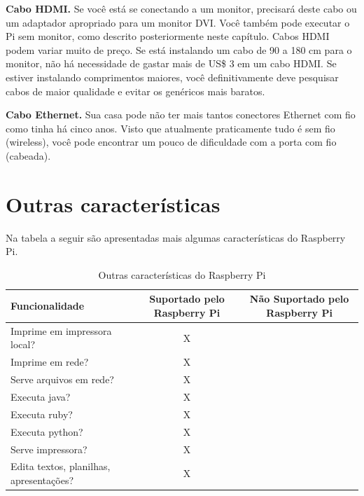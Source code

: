 \textbf{Cabo HDMI.} Se você está se conectando a um monitor, precisará deste cabo ou um adaptador apropriado para um monitor DVI. Você também pode executar o Pi sem monitor, como descrito posteriormente neste capítulo. Cabos HDMI podem variar muito de preço. Se está instalando um cabo de 90 a 180 cm para o monitor, não há necessidade de gastar mais de US\$ 3 em um cabo HDMI. Se estiver instalando comprimentos maiores, você definitivamente deve pesquisar cabos de maior qualidade e evitar os genéricos mais baratos.

\textbf{Cabo Ethernet.} Sua casa pode não ter mais tantos conectores Ethernet com fio como tinha há cinco anos. Visto que atualmente praticamente tudo é sem fio (wireless), você pode encontrar um pouco de dificuldade com a porta com fio (cabeada).

\newpage

\section{Outras características}

Na tabela a seguir são apresentadas mais algumas características do Raspberry Pi.

\begin{table}[!htpb]
 \centering
    \begin{tabular}{|p{4cm}|c|c|} 
    \hline
        \textbf{Funcionalidade} & \textbf{Suportado pelo Raspberry Pi} & \textbf{Não Suportado pelo Raspberry Pi} \\
    \hline
        Imprime em impressora local? & X & \\
    \hline
        Imprime em rede? & X & \\
    \hline
        Serve arquivos em rede? & X & \\
    \hline
        Executa java? & X & \\
    \hline
        Executa ruby? & X & \\
    \hline
        Executa python? & X & \\
    \hline
        Serve impressora? & X & \\
    \hline
        Edita textos, planilhas, apresentações? & X & \\
    \hline
    \end{tabular}
    \caption{Outras características do Raspberry Pi}
    \label{t_fixa}
\end{table}

